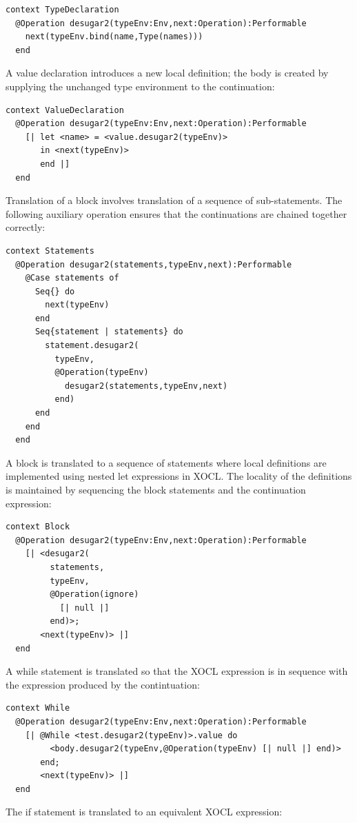 \begin{lstlisting}
context TypeDeclaration
  @Operation desugar2(typeEnv:Env,next:Operation):Performable
    next(typeEnv.bind(name,Type(names)))
  end
\end{lstlisting}A value declaration introduces a new local definition; the body is
created by supplying the unchanged type environment to the continuation:

\begin{lstlisting}
context ValueDeclaration
  @Operation desugar2(typeEnv:Env,next:Operation):Performable
    [| let <name> = <value.desugar2(typeEnv)> 
       in <next(typeEnv)> 
       end |]
  end
\end{lstlisting}Translation of a block involves translation of a sequence of sub-statements.
The following auxiliary operation ensures that the continuations are
chained together correctly:

\begin{lstlisting}
context Statements
  @Operation desugar2(statements,typeEnv,next):Performable
    @Case statements of
      Seq{} do 
        next(typeEnv)
      end
      Seq{statement | statements} do 
        statement.desugar2(
          typeEnv,
          @Operation(typeEnv)
            desugar2(statements,typeEnv,next)
          end) 
      end
    end
  end
\end{lstlisting}A block is translated to a sequence of statements where local definitions
are implemented using nested let expressions in XOCL. The locality
of the definitions is maintained by sequencing the block statements
and the continuation expression:

\begin{lstlisting}
context Block
  @Operation desugar2(typeEnv:Env,next:Operation):Performable
    [| <desugar2(
         statements,
         typeEnv,
         @Operation(ignore) 
           [| null |] 
         end)>;
       <next(typeEnv)> |]
  end
\end{lstlisting}A while statement is translated so that the XOCL expression is in
sequence with the expression produced by the contintuation:

\begin{lstlisting}
context While
  @Operation desugar2(typeEnv:Env,next:Operation):Performable
    [| @While <test.desugar2(typeEnv)>.value do
         <body.desugar2(typeEnv,@Operation(typeEnv) [| null |] end)>
       end;
       <next(typeEnv)> |]
  end
\end{lstlisting}The if statement is translated to an equivalent XOCL expression:

